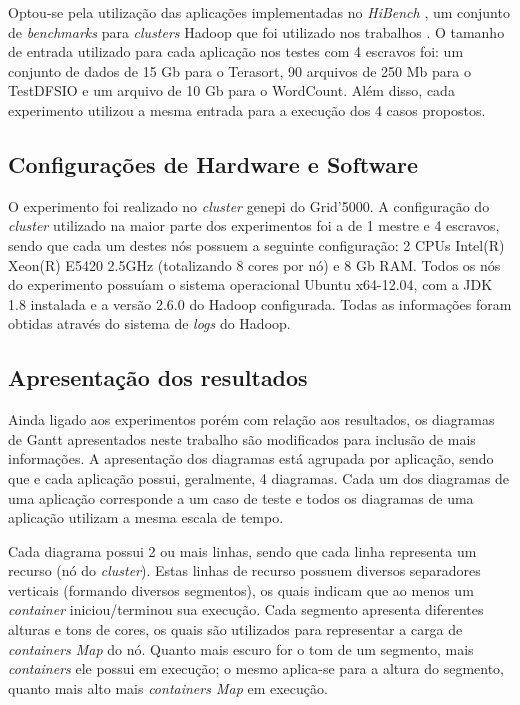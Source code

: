 Optou-se pela utilização das aplicações implementadas no \textit{HiBench} \cite{HiBench}, um conjunto de \textit{benchmarks} para \textit{clusters} Hadoop que foi utilizado nos trabalhos \cite{HBA} \cite{HBB} \cite{HBC}. O tamanho de entrada utilizado para cada aplicação nos testes com 4 escravos foi: um conjunto de dados de 15 Gb para o Terasort, 90 arquivos de 250 Mb para o TestDFSIO e um arquivo de 10 Gb para o WordCount. Além disso, cada experimento utilizou a mesma entrada para a execução dos 4 casos propostos.

\subsection{Configurações de Hardware e Software}
O experimento foi realizado no \textit{cluster} genepi do Grid'5000. A configuração do \textit{cluster} utilizado na maior parte dos experimentos foi a de 1 mestre e 4 escravos, sendo que cada um destes nós possuem a seguinte configuração: 2 CPUs Intel(R) Xeon(R) E5420 2.5GHz (totalizando 8 cores por nó) e 8 Gb RAM. Todos os nós do experimento possuíam o sistema operacional Ubuntu x64-12.04, com a JDK 1.8 instalada e a versão 2.6.0 do Hadoop configurada. Todas as informações foram obtidas através do sistema de \textit{logs} do Hadoop.

\subsection{Apresentação dos resultados}
\label{sec:apresentacao}
Ainda ligado aos experimentos porém com relação aos resultados, os diagramas de Gantt apresentados neste trabalho são modificados para inclusão de mais informações. A apresentação dos diagramas está agrupada por aplicação, sendo que e cada aplicação possui, geralmente, 4 diagramas. Cada um dos diagramas de uma aplicação corresponde a um caso de teste e todos os diagramas de uma aplicação utilizam a mesma escala de tempo.

Cada diagrama possui 2 ou mais linhas, sendo que cada linha representa  um recurso (nó do \textit{cluster}). Estas linhas de recurso possuem diversos separadores verticais (formando diversos segmentos), os quais indicam que ao menos um \textit{container} iniciou/terminou sua execução. Cada segmento apresenta diferentes alturas e tons de cores, os quais são utilizados para representar a carga de \textit{containers Map} do nó. Quanto mais escuro for o tom de um segmento, mais \textit{containers} ele possui em execução; o mesmo aplica-se para a altura do segmento, quanto mais alto mais \textit{containers Map} em execução.

